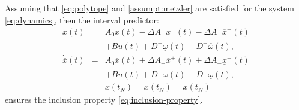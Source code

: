 \documentclass{article}
\begin{document}
\begin{theorem}
\label{thm:predictor}
Assuming that \eqref{eq:polytope} and \autoref{assumpt:metzler} are satisfied for the system \eqref{eq:dynamics}, then the interval predictor:
\begin{eqnarray}
\dot{\underline{x}}(t) & = & A_{0}\underline{x}(t)-\Delta A_{+}\underline{x}^{-}(t)-\Delta A_{-}\overline{x}^{+}(t)\nonumber \\
 &  & +Bu(t)+D^{+}\underline{\omega}(t)-D^{-}\overline{\omega}(t),\nonumber\\
\dot{\overline{x}}(t) & = & A_{0}\overline{x}(t)+\Delta A_{+}\overline{x}^{+}(t)+\Delta A_{-}\underline{x}^{-}(t) \label{eq:interval-predictor} \\
 &  & +Bu(t)+D^{+}\overline{\omega}(t)-D^{-}\underline{\omega}(t),\nonumber \\
 &  & \underline{x}(t_N)=\overline{x}(t_N)={x}(t_N)\nonumber 
\end{eqnarray}
ensures the inclusion property \eqref{eq:inclusion-property}.


\end{theorem}
\end{document}
